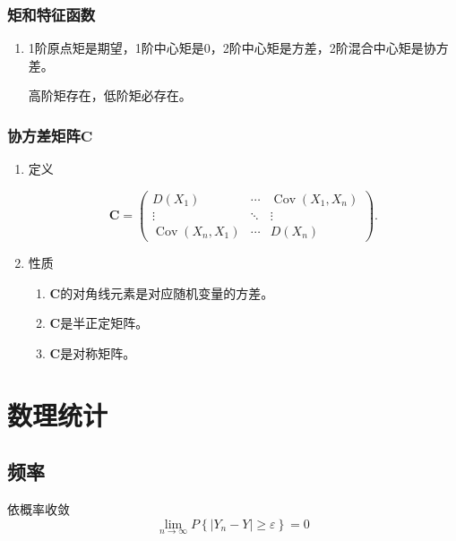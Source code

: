 \documentclass[UTF8,fontset=fandol,zihao=5]{ctexart}
\newcommand{\vect}[1]{\bm{#1}}
\begin{document}
\subsubsection{矩和特征函数}
\begin{enumerate}
  \item 

1阶原点矩是期望，1阶中心矩是0，2阶中心矩是方差，2阶混合中心矩是协方差。

高阶矩存在，低阶矩必存在。
\end{enumerate}

\subsubsection{协方差矩阵\texorpdfstring{$\boldsymbol{C}$}{C}}

\begin{enumerate}
  
  \item 定义
  
  \[
      \boldsymbol{C}
    =\begin{pmatrix}
        D(X_1) & \cdots & \operatorname{Cov}(X_1,X_n)\\
        \vdots & \ddots & \vdots\\
        \operatorname{Cov}(X_n,X_1) & \cdots & D(X_n)
    \end{pmatrix}.
  \]

  \item 性质

  \begin{enumerate}[label=(\arabic*)]
    \item $\vect C$的对角线元素是对应随机变量的方差。
    \item $\vect C$是半正定矩阵。
    \item $\vect C$是对称矩阵。
  \end{enumerate}

\end{enumerate}

\section{数理统计}

\subsection{频率}

依概率收敛
\[
\lim_{n\to\infty} P\left\{\left|Y_n - Y\right| \geq \varepsilon\right\} = 0
\]
\end{document}
